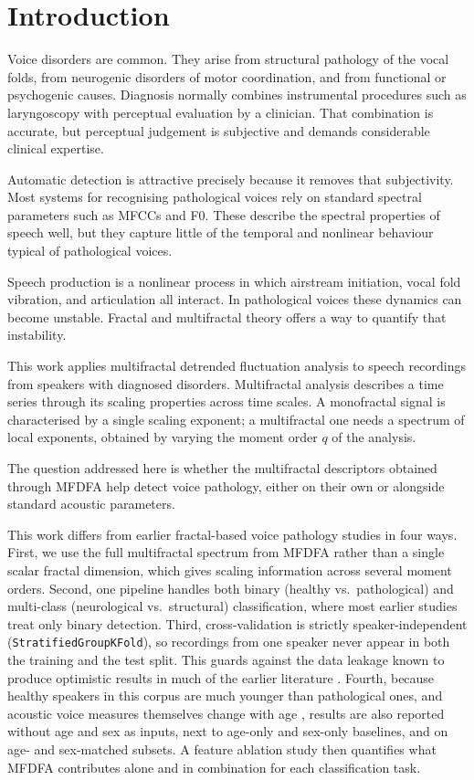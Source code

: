 \documentclass[runningheads]{llncs}
\begin{document}
  \section{Introduction}
  \label{sec:introduction}

Voice disorders are common. They arise from structural pathology of the vocal folds, from neurogenic disorders of motor coordination, and from functional or psychogenic causes. Diagnosis normally combines instrumental procedures such as laryngoscopy with perceptual evaluation by a clinician. That combination is accurate, but perceptual judgement is subjective and demands considerable clinical expertise.

Automatic detection is attractive precisely because it removes that subjectivity. Most systems for recognising pathological voices rely on standard spectral parameters such as MFCCs and F0. These describe the spectral properties of speech well, but they capture little of the temporal and nonlinear behaviour typical of pathological voices.

Speech production is a nonlinear process in which airstream initiation, vocal fold vibration, and articulation all interact. In pathological voices these dynamics can become unstable. Fractal and multifractal theory offers a way to quantify that instability.

This work applies multifractal detrended fluctuation analysis to speech recordings from speakers with diagnosed disorders. Multifractal analysis describes a time series through its scaling properties across time scales. A monofractal signal is characterised by a single scaling exponent; a multifractal one needs a spectrum of local exponents, obtained by varying the moment order $q$ of the analysis.

The question addressed here is whether the multifractal descriptors obtained through MFDFA help detect voice pathology, either on their own or alongside standard acoustic parameters.

  This work differs from earlier fractal-based voice pathology studies in four ways. First, we use the full multifractal spectrum from MFDFA rather than a single scalar fractal dimension, which gives scaling information across several moment orders. Second, one pipeline handles both binary (healthy vs.\ pathological) and multi-class (neurological vs.\ structural) classification, where most earlier studies treat only binary detection. Third, cross-validation is strictly speaker-independent (\texttt{StratifiedGroupKFold}), so recordings from one speaker never appear in both the training and the test split. This guards against the data leakage known to produce optimistic results in much of the earlier literature \cite{saenzlechon2006}. Fourth, because healthy speakers in this corpus are much younger than pathological ones, and acoustic voice measures themselves change with age \cite{ferrand2002}, results are also reported without age and sex as inputs, next to age-only and sex-only baselines, and on age- and sex-matched subsets. A feature ablation study then quantifies what MFDFA contributes alone and in combination for each classification task.
\end{document}
